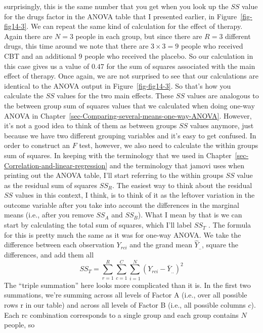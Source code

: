 \documentclass[
  a4paper,
]{book}
\begin{document}
{  surprisingly, this is the same number that you get when you look up
  the \(SS\) value for the drugs factor in the ANOVA table that I
  presented earlier, in Figure~\ref{fig-fig14-3}. We can repeat the same
  kind of calculation for the effect of therapy. Again there are
  \(N = 3\) people in each group, but since there are \(R = 3\)
  different drugs, this time around we note that there are
  \(3 \times 3 = 9\) people who received CBT and an additional 9 people
  who received the placebo. So our calculation in this case gives us a
  value of \(0.47\) for the sum of squares associated with the main
  effect of therapy. Once again, we are not surprised to see that our
  calculations are identical to the ANOVA output in
  Figure~\ref{fig-fig14-3}. So that's how you calculate the \(SS\)
  values for the two main effects. These \(SS\) values are analogous to
  the between group sum of squares values that we calculated when doing
  one-way ANOVA in
  Chapter~\ref{sec-Comparing-several-means-one-way-ANOVA}. However, it's
  not a good idea to think of them as between groups \(SS\) values
  anymore, just because we have two different grouping variables and
  it's easy to get confused. In order to construct an \(F\) test,
  however, we also need to calculate the within groups sum of squares.
  In keeping with the terminology that we used in
  Chapter~\ref{sec-Correlation-and-linear-regression} and the
  terminology that jamovi uses when printing out the ANOVA table, I'll
  start referring to the within groups \(SS\) value as the residual sum
  of squares \(SS_R\). The easiest way to think about the residual
  \(SS\) values in this context, I think, is to think of it as the
  leftover variation in the outcome variable after you take into account
  the differences in the marginal means (i.e., after you remove \(SS_A\)
  and \(SS_B\)). What I mean by that is we can start by calculating the
  total sum of squares, which I'll label \(SS_T\) . The formula for this
  is pretty much the same as it was for one-way ANOVA. We take the
  difference between each observation \(Y_{rci}\) and the grand mean
  \(\hat{Y}_{..}\), square the differences, and add them all
  \[SS_T=\sum_{r=1}^R \sum_{c=1}^C \sum_{i=1}^N (Y_{rci}-\bar{Y}_{..})^2\]
  The ``triple summation'' here looks more complicated than it is. In
  the first two summations, we're summing across all levels of Factor A
  (i.e., over all possible rows r in our table) and across all levels of
  Factor B (i.e., all possible columns \(c\)). Each rc combination
  corresponds to a single group and each group contains \(N\) people, so
}
\end{document}
